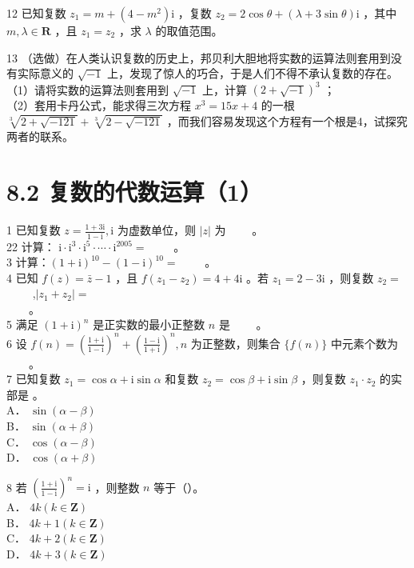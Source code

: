 \documentclass[10pt]{article}
\begin{document}
12 已知复数 \(z_{1}=m+\left(4-m^{2}\right) \mathrm{i}\) ，复数 \(z_{2}=2 \cos \theta+(\lambda+3 \sin \theta) \mathrm{i}\) ，其中 \(m, \lambda \in \mathbf{R}\) ，且 \(z_{1}=z_{2}\) ，求 \(\lambda\) 的取值范围。

13 （选做）在人类认识复数的历史上，邦贝利大胆地将实数的运算法则套用到没有实际意义的 \(\sqrt{-1}\) 上，发现了惊人的巧合，于是人们不得不承认复数的存在。\\
（1）请将实数的运算法则套用到 \(\sqrt{-1}\) 上，计算 \((2+\sqrt{-1})^{3}\) ；\\
（2）套用卡丹公式，能求得三次方程 \(x^{3}=15 x+4\) 的一根 \(\sqrt[3]{2+\sqrt{-121}}+\sqrt[3]{2-\sqrt{-121}}\) ，而我们容易发现这个方程有一个根是4，试探究两者的联系。

\section*{8.2 复数的代数运算（1）}
1 已知复数 \(z=\frac{1+3 \mathrm{i}}{1-\mathrm{i}}, \mathrm{i}\) 为虚数单位，则 \(|z|\) 为 \(\qquad\)。\\
22 计算： \(\mathrm{i} \cdot \mathrm{i}^{3} \cdot \mathrm{i}^{5} \cdot \cdots \cdot \mathrm{i}^{2005}=\) \(\qquad\)。\\
3 计算：\((1+\mathrm{i})^{10}-(1-\mathrm{i})^{10}=\) \(\qquad\)。\\
4 已知 \(f(z)=\bar{z}-1\) ，且 \(f\left(z_{1}-z_{2}\right)=4+4 \mathrm{i}\) 。若 \(z_{1}=2-3 \mathrm{i}\) ，则复数 \(z_{2}=\) \(\qquad\) ,\(\left|z_{1}+z_{2}\right|=\)\\
\(\qquad\)。\\
5 满足 \((1+\mathrm{i})^{n}\) 是正实数的最小正整数 \(n\) 是 \(\qquad\)。\\
6 设 \(f(n)=\left(\frac{1+\mathrm{i}}{1-\mathrm{i}}\right)^{n}+\left(\frac{1-\mathrm{i}}{1+\mathrm{i}}\right)^{n}, n\) 为正整数，则集合 \(\{f(n)\}\) 中元素个数为 \(\qquad\)。\\
7 已知复数 \(z_{1}=\cos \alpha+\mathrm{i} \sin \alpha\) 和复数 \(z_{2}=\cos \beta+\mathrm{i} \sin \beta\) ，则复数 \(z_{1} \cdot z_{2}\) 的实部是 。\\
A． \(\sin (\alpha-\beta)\)\\
B． \(\sin (\alpha+\beta)\)\\
C． \(\cos (\alpha-\beta)\)\\
D． \(\cos (\alpha+\beta)\)

8 若 \(\left(\frac{1+\mathrm{i}}{1-\mathrm{i}}\right)^{n}=\mathrm{i}\) ，则整数 \(n\) 等于（）。\\
A． \(4 k(k \in \mathbf{Z})\)\\
B． \(4 k+1(k \in \mathbf{Z})\)\\
C． \(4 k+2(k \in \mathbf{Z})\)\\
D． \(4 k+3(k \in \mathbf{Z})\)
\end{document}
